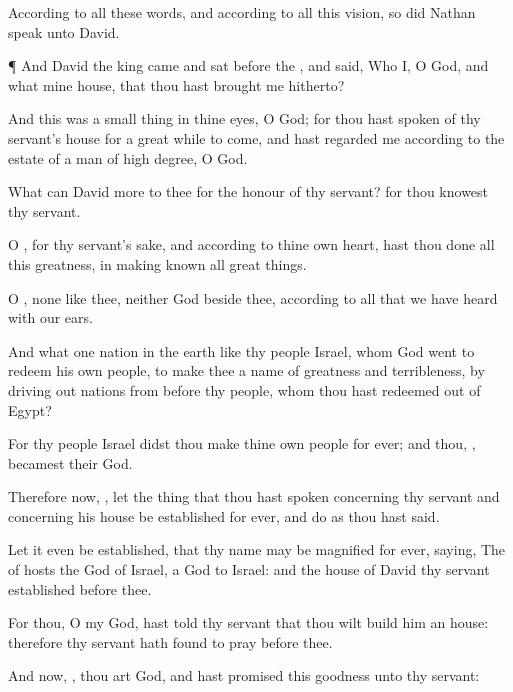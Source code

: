 {According to all these
words, and according to all this
vision, so did
Nathan
speak unto
David.


\par }{\PP {}¶ And
David the
king
came and
sat
before the
{}, and
said, Who
{} I, O
{}
God, and what
{} mine
house, that thou hast
brought me
hitherto?

And
{} this was a small
thing in thine
eyes, O
God; for thou hast
{}
spoken of thy
servant’s
house for a great while to
come, and hast
regarded me according to the
estate of a
man of high
degree, O
{}
God.

What
can
David
{}
more to thee for the
honour of thy
servant? for thou
knowest thy
servant.

O
{}, for thy
servant’s sake, and according to thine own
heart, hast thou
done all this
greatness, in making
known all
{} great
things.

O
{},
{} none like thee, neither
{}
God
beside thee, according to all that we have
heard with our
ears.

And what
one
nation in the
earth
{} like thy
people
Israel, whom
God
went to
redeem
{} his own
people, to
make thee a
name of
greatness and
terribleness, by driving
out
nations from
before thy
people, whom thou hast
redeemed out of
Egypt?

For thy
people
Israel didst thou
make thine own
people
for
ever; and thou,
{}, becamest their
God.

Therefore now,
{}, let the
thing that thou hast
spoken concerning thy
servant and concerning his
house be
established
for
ever, and
do as thou hast
said.

Let it even be
established, that thy
name may be
magnified
for
ever,
saying, The
{} of
hosts
{} the
God of
Israel,
{} a
God to
Israel: and
{} the
house of
David thy
servant
{}
established
before thee.

For thou, O my
God, hast
told thy
servant that thou wilt
build him an
house: therefore thy
servant hath
found
{} to
pray
before thee.

And now,
{}, thou art
God, and hast
promised this
goodness unto thy
servant:

}
